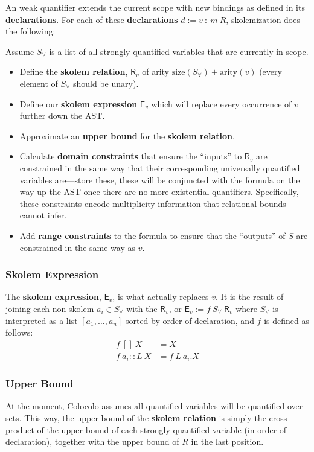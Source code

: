 \documentclass[10pt]{article}
\theoremstyle{definition}
\begin{document}
  An weak quantifier extends the current scope with new bindings as defined in its \textbf{declarations}. For each of these \textbf{declarations} $d := v~:~m~R$, skolemization does the following:

  Assume $S_\forall$ is a list of all strongly quantified variables that are currently in scope.

  \begin{itemize}
      \item Define the \textbf{skolem relation}, $\textsf{R}_v$ of arity $\text{size}(S_\forall) + \text{arity}(v)$ (every element of $S_\forall$ should be unary).
      \item Define our \textbf{skolem expression} $\textsf{E}_v$ which will replace every occurrence of $v$ further down the AST.
      \item Approximate an \textbf{upper bound} for the \textbf{skolem relation}.
      \item Calculate \textbf{domain constraints} that ensure the ``inputs'' to $\textsf{R}_v$ are constrained in the same way that their corresponding universally quantified variables are---store these, these will be conjuncted with the formula on the way up the AST once there are no more existential quantifiers. Specifically, these constraints encode multiplicity information that relational bounds cannot infer.
      \item Add \textbf{range constraints} to the formula to ensure that the ``outputs'' of $S$ are constrained in the same way as $v$.
  \end{itemize}

  \subsubsection*{Skolem Expression}

  The \textbf{skolem expression}, $\textsf{E}_v$, is what actually replaces $v$. It is the result of joining each non-skolem $a_i \in S_\forall$ with the $\textsf{R}_v$, or $\textsf{E}_v := f~S_\forall~\textsf{R}_v$ where $S_\forall$ is interpreted as a list $[a_1,\dots,a_n]$ sorted by order of declaration, and $f$ is defined as follows:
  \begin{align*}
      f~[]~X& = X\\
      f~a_i::L~X& = f~L~a_i\textbf{.}X
  \end{align*}

  \subsubsection*{Upper Bound}
  At the moment, Colocolo assumes all quantified variables will be quantified over sets. This way, the upper bound of the \textbf{skolem relation} is simply the cross product of the upper bound of each strongly quantified variable (in order of declaration), together with the upper bound of $R$ in the last position.
\end{document}
